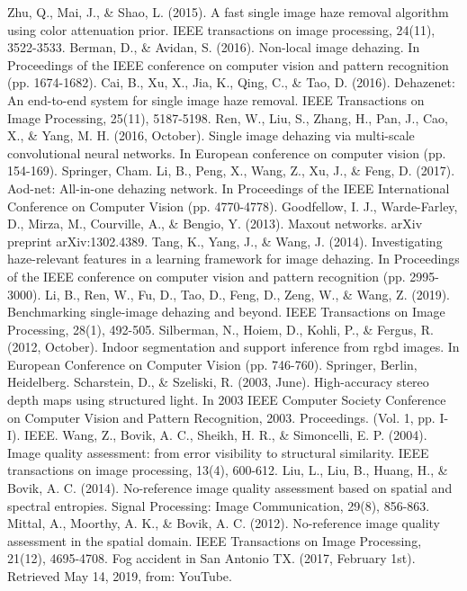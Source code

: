 \documentclass[a4paper, 12pt, oneside]{report}
\begin{document}
\begin{thebibliography}{99}
 Zhu, Q., Mai, J., \& Shao, L. (2015). A fast single image haze removal algorithm using color attenuation prior. IEEE transactions on image processing, 24(11), 3522-3533.
 Berman, D., \& Avidan, S. (2016). Non-local image dehazing. In Proceedings of the IEEE conference on computer vision and pattern recognition (pp. 1674-1682).
 Cai, B., Xu, X., Jia, K., Qing, C., \& Tao, D. (2016). Dehazenet: An end-to-end system for single image haze removal. IEEE Transactions on Image Processing, 25(11), 5187-5198.
 Ren, W., Liu, S., Zhang, H., Pan, J., Cao, X., \& Yang, M. H. (2016, October). Single image dehazing via multi-scale convolutional neural networks. In European conference on computer vision (pp. 154-169). Springer, Cham.
 Li, B., Peng, X., Wang, Z., Xu, J., \& Feng, D. (2017). Aod-net: All-in-one dehazing network. In Proceedings of the IEEE International Conference on Computer Vision (pp. 4770-4778).
 Goodfellow, I. J., Warde-Farley, D., Mirza, M., Courville, A., \& Bengio, Y. (2013). Maxout networks. arXiv preprint arXiv:1302.4389.
 Tang, K., Yang, J., \& Wang, J. (2014). Investigating haze-relevant features in a learning framework for image dehazing. In Proceedings of the IEEE conference on computer vision and pattern recognition (pp. 2995-3000).
 Li, B., Ren, W., Fu, D., Tao, D., Feng, D., Zeng, W., \& Wang, Z. (2019). Benchmarking single-image dehazing and beyond. IEEE Transactions on Image Processing, 28(1), 492-505.
 Silberman, N., Hoiem, D., Kohli, P., \& Fergus, R. (2012, October). Indoor segmentation and support inference from rgbd images. In European Conference on Computer Vision (pp. 746-760). Springer, Berlin, Heidelberg.
 Scharstein, D., \& Szeliski, R. (2003, June). High-accuracy stereo depth maps using structured light. In 2003 IEEE Computer Society Conference on Computer Vision and Pattern Recognition, 2003. Proceedings. (Vol. 1, pp. I-I). IEEE.
 Wang, Z., Bovik, A. C., Sheikh, H. R., \& Simoncelli, E. P. (2004). Image quality assessment: from error visibility to structural similarity. IEEE transactions on image processing, 13(4), 600-612.
 Liu, L., Liu, B., Huang, H., \& Bovik, A. C. (2014). No-reference image quality assessment based on spatial and spectral entropies. Signal Processing: Image Communication, 29(8), 856-863.
 Mittal, A., Moorthy, A. K., \& Bovik, A. C. (2012). No-reference image quality assessment in the spatial domain. IEEE Transactions on Image Processing, 21(12), 4695-4708.
 Fog accident in San Antonio TX. (2017, February 1st). Retrieved May 14, 2019, from: YouTube. 

\end{thebibliography}
\end{document}
